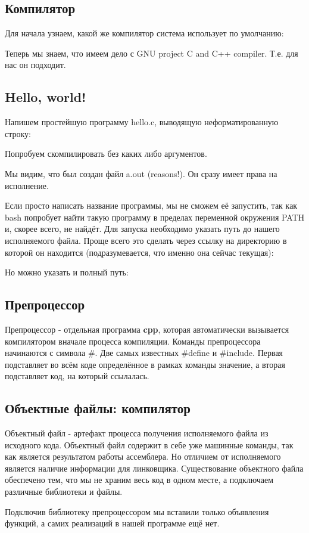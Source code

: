 \documentclass[a4paper]{article}
\begin{document}
\subsection{Компилятор}
Для начала узнаем, какой же компилятор система использует по умолчанию:

Теперь мы знаем, что имеем дело с GNU project C and C++ compiler. Т.е. для нас он подходит.
\subsection{Hello,  world!}
Напишем простейшую программу hello.c, выводящую неформатированную строку:

Попробуем скомпилировать без каких либо аргументов.

Мы видим, что был создан файл a.out (reasons!). Он сразу имеет права на исполнение.

Если просто написать название программы, мы не сможем её запустить, так как bash попробует найти такую программу в пределах переменной окружения PATH и, скорее всего, не найдёт. Для запуска необходимо указать путь до нашего исполняемого файла. Проще всего это сделать через ссылку на директорию в которой он находится (подразумевается, что именно она сейчас текущая):

Но можно указать и полный путь:

\subsection{ Препроцессор}
Препроцессор - отдельная программа \textbf{cpp}, которая автоматически вызывается компилятором вначале процесса компиляции. Команды препроцессора начинаются с символа \#. Две самых известных \#define и \#include. Первая подставляет во всём коде определённое в рамках команды значение, а вторая подставляет код, на который ссылалась.

\subsection{Объектные файлы: компилятор}
Объектный файл - артефакт процесса получения исполняемого файла из исходного кода. Объектный файл содержит в себе уже машинные команды, так как является результатом работы ассемблера. Но отличием от исполняемого является наличие информации для линковщика. Существование объектного файла обеспечено тем, что мы не храним весь код в одном месте, а подключаем различные библиотеки и файлы.

Подключив библиотеку препроцессором мы вставили только объявления функций, а самих реализаций в нашей программе ещё нет.
\end{document}
